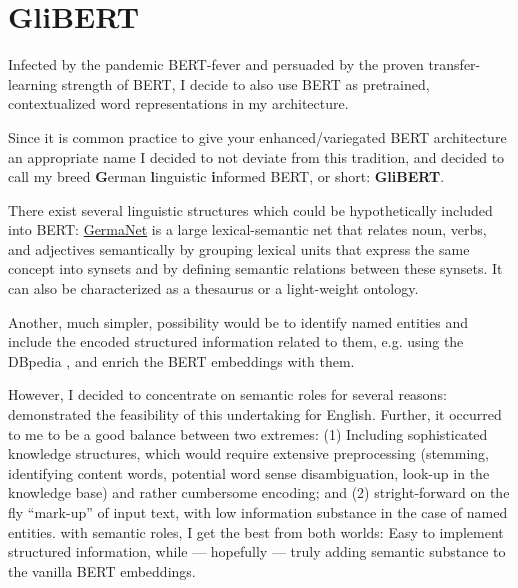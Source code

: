 \section{GliBERT}

Infected by the pandemic BERT-fever and persuaded by the proven transfer-learning
strength of BERT, I decide to also use BERT as pretrained, contextualized word
representations in my architecture.


Since it is common practice to give your enhanced/variegated BERT architecture an appropriate
name I decided to not deviate from this tradition, and decided to call my breed \textbf{G}erman
\textbf{l}inguistic \textbf{i}nformed BERT, or short: \textbf{GliBERT}.

There exist several linguistic structures which could be hypothetically included into BERT:
\href{https://uni-tuebingen.de/en/faculties/faculty-of-humanities/departments/modern-languages/department-of-linguistics/chairs/general-and-computational-linguistics/ressources/lexica/germanet/}{GermaNet} \citep{hamp1997germanet}
is a large lexical-semantic net that relates noun, verbs, and adjectives semantically by
grouping lexical units that express the same concept into synsets and by defining semantic
relations between these synsets. It can also be characterized as a thesaurus or a light-weight
ontology.

Another, much simpler, possibility would be to identify named entities
and include the encoded structured
information related to them, e.g. using the DBpedia \citep{auer2007dbpedia}, and enrich
the BERT embeddings with them.

However, I decided to concentrate on semantic roles for several reasons: \citeauthor{zhang2019semantics}
demonstrated the feasibility of this undertaking for English. Further, it occurred to me to be a good
balance between two extremes: (1) Including sophisticated knowledge structures, which would
require extensive preprocessing (stemming, identifying content words, potential word sense
disambiguation, look-up in the knowledge base) and rather cumbersome encoding; and (2)
stright-forward on the fly ``mark-up'' of input text, with low information substance in the
case of named entities. with semantic roles, I get the best from both worlds: Easy to implement
structured information, while --- hopefully --- truly adding semantic substance to the vanilla
BERT embeddings.



